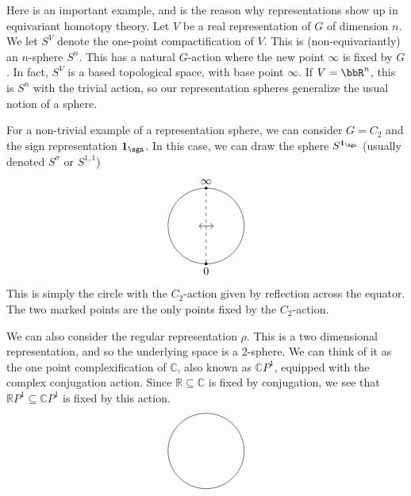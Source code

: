 \documentclass{willowtreebook}
\begin{document}
\begin{example}[label=ex:rep-spheres]
    Here is an important example, and is the reason why representations show up in equivariant homotopy theory. Let $V$ be a real representation of $G$ of dimension $n$. We let $S^V$ denote the one-point compactification of $V$. This is (non-equivariantly) an $n$-sphere $S^n$. This has a natural $G$-action where the new point $\infty$ is fixed by $G$. In fact, $S^V$ is a based topological space, with base point $\infty$. If $V = \bbR^n$, this is $S^n$ with the trivial action, so our representation spheres generalize the usual notion of a sphere. 

    For a non-trivial example of a representation sphere, we can consider $G = C_2$ and the sign representation $\mathbf{1}_{\sgn}$. In this case, we can draw the sphere $S^{\mathbf{1}_{\sgn}}$ (usually denoted $S^{\sigma}$ or $S^{1,1}$)
\[
    \begin{tikzpicture}[scale=0.6]
  \draw (0,0) circle [radius=2cm];

  \coordinate (top) at (0,2);
  \coordinate (bottom) at (0,-2);
  \fill (top) circle [radius=2pt];
  \fill (bottom) circle [radius=2pt];

  \draw[dashed] (0,2.1) -- (0,-2.1);

  \draw[<->, shorten >=2pt, shorten <=2pt] (-0.5,0) -- (0.5,0);

  \node[above] at (top) {$\infty$};
  \node[below] at (bottom) {$0$};
\end{tikzpicture}
\]
This is simply the circle with the $C_2$-action given by reflection across the equator. The two marked points are the only points fixed by the $C_2$-action.

We can also consider the regular representation $\rho$. This is a two dimensional representation, and so the underlying space is a 2-sphere. We can think of it as the one point complexification of $\mathbb{C}$, also known as $\mathbb{C}P^1$, equipped with the complex conjugation action. Since $\mathbb{R} \subseteq \mathbb{C}$ is fixed by conjugation, we see that $\mathbb{R}P^1 \subseteq \mathbb{C}P^1$ is fixed by this action. 
\[
\begin{tikzpicture}[scale=0.6]
  \draw (0,0) circle [radius=2cm];

  \coordinate (top) at (0,2);
  \coordinate (bottom) at (0,-2);


\end{tikzpicture}\]
\end{example}
\end{document}
